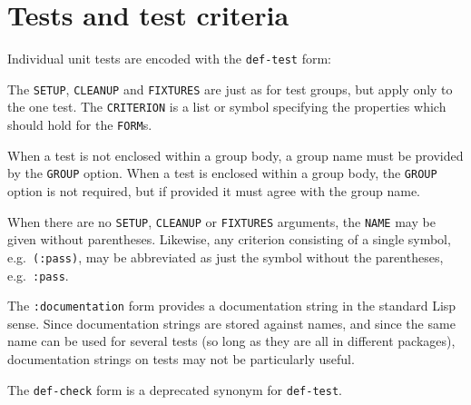 
\section{Tests and test criteria}
\label{sec:deftest}
Individual unit tests are encoded with the \texttt{def-test} form:

%
The \texttt{SETUP}, \texttt{CLEANUP} and \texttt{FIXTURES} are just as
for test groups, but apply only to the one test.  The
\texttt{CRITERION} is a list or symbol specifying the properties which
should hold for the \texttt{FORM}s.

When a test is not enclosed within a group body, a group name must be
provided by the \texttt{GROUP} option.  When a test is enclosed within
a group body, the \texttt{GROUP} option is not required, but if
provided it must agree with the group name.

When there are no \texttt{SETUP}, \texttt{CLEANUP} or
\texttt{FIXTURES} arguments, the \texttt{NAME} may be given without
parentheses.  Likewise, any criterion consisting of a single symbol,
e.g.\ \texttt{(:pass)}, may be abbreviated as just the symbol without
the parentheses, e.g.\ \texttt{:pass}.

The \texttt{:documentation} form provides a documentation string in
the standard Lisp sense.  Since documentation strings are stored
against names, and since the same name can be used for several tests
(so long as they are all in different packages), documentation strings
on tests may not be particularly useful.

The \texttt{def-check} form is a deprecated synonym for
\texttt{def-test}.

\def\criteriaGroup#1#2{\subsection{#1} #2}
\def\secText#1{#1}
\def\endcriteriaGroup{}
\def\manualOrRef#1#2{#1}
\def\criteriaDoc#1#2#3#4#5#6#7#8{%
\subsubsection{The \texttt{#2} criterion} 
#4\index{#1@\texttt{#2}}
\\ Syntax: \texttt{#3}
#7{#8}#6}
\def\noEx#1{}
\def\singleEx#1{\\Example: \texttt{#1}}
\def\multiEx#1{#1}
\def\passExample#1{\\Passing example: \texttt{#1}}
\def\failExample#1{\\Failing example: \texttt{#1}}
\def\tabbingEx#1{\\Example: \begin{tabbing}#1\end{tabbing}}
\def\noExpl{}
\def\hasExpl#1{\par#1}


